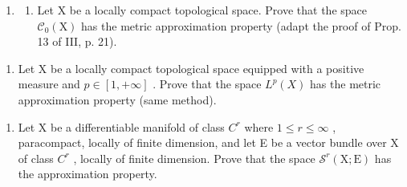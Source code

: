 \begin{enumerate}
\def\labelenumi{\arabic{enumi})}
\setcounter{enumi}{35}
\tightlist
\item
  \begin{enumerate}
  \def\labelenumii{\alph{enumii})}
  \tightlist
  \item
    Let X be a locally compact topological space. Prove that the space \(\mathcal{C}_{0}(\mathrm{X})\) has the metric approximation property (adapt the proof of Prop. 13 of III, p. 21).
  \end{enumerate}
\end{enumerate}

\begin{enumerate}
\def\labelenumi{\alph{enumi})}
\setcounter{enumi}{1}
\tightlist
\item
  Let X be a locally compact topological space equipped with a positive measure and \(p \in [1, +\infty]\) . Prove that the space \(L^{p}(X)\) has the metric approximation property (same method).
\end{enumerate}

\begin{enumerate}
\def\labelenumi{\arabic{enumi})}
\setcounter{enumi}{36}
\tightlist
\item
  Let X be a differentiable manifold of class \(C^{r}\) where \(1 \leqslant r \leqslant \infty\) , paracompact, locally of finite dimension, and let E be a vector bundle over X of class \(C^{r}\) , locally of finite dimension. Prove that the space \(\mathcal{S}^{r}(\mathrm{X};\mathrm{E})\) has the approximation property.
\end{enumerate}

